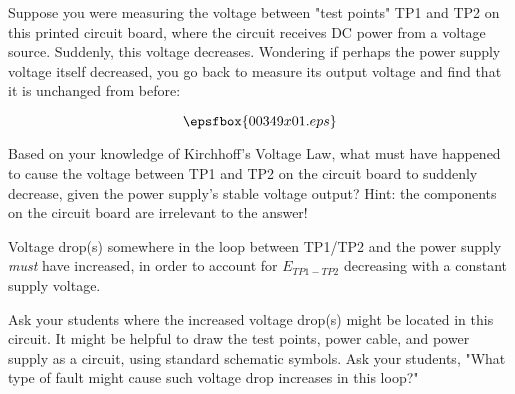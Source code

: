 

Suppose you were measuring the voltage between "test points" TP1 and TP2 on this printed circuit board, where the circuit receives DC power from a voltage source.  Suddenly, this voltage decreases.  Wondering if perhaps the power supply voltage itself decreased, you go back to measure its output voltage and find that it is unchanged from before:

$$\epsfbox{00349x01.eps}$$

Based on your knowledge of Kirchhoff's Voltage Law, what must have happened to cause the voltage between TP1 and TP2 on the circuit board to suddenly decrease, given the power supply's stable voltage output?  Hint: the components on the circuit board are irrelevant to the answer!







Voltage drop(s) somewhere in the loop between TP1/TP2 and the power supply {\it must} have increased, in order to account for $E_{TP1-TP2}$ decreasing with a constant supply voltage.







Ask your students where the increased voltage drop(s) might be located in this circuit.  It might be helpful to draw the test points, power cable, and power supply as a circuit, using standard schematic symbols.  Ask your students, "What type of fault might cause such voltage drop increases in this loop?"




